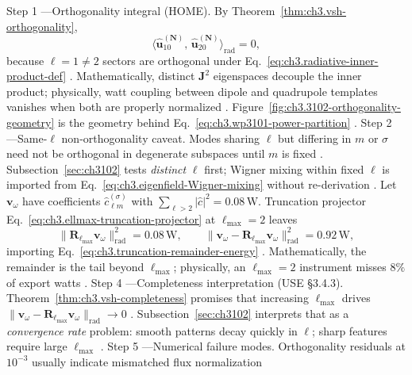 Step 1 ---Orthogonality integral (HOME). By Theorem~\ref{thm:ch3.vsh-orthogonality},
\begin{equation}
\label{eq:ch3.wp3102-orthogonality-integral}
\bigl\langle \widehat{\mathbf{u}}_{10}^{(\mathbf{N})},\,\widehat{\mathbf{u}}_{20}^{(\mathbf{N})}\bigr\rangle_{\mathrm{rad}}
=
0,
\end{equation}
because \(\ell=1\neq2\) sectors are orthogonal under Eq.~\eqref{eq:ch3.radiative-inner-product-def} \cite{hansen1988}.
Mathematically, distinct \(\mathbf{J}^{2}\) eigenspaces decouple the inner product; physically, watt coupling between dipole and quadrupole
templates vanishes when both are properly normalized \cite{poynting1884}. Figure~\ref{fig:ch3.3102-orthogonality-geometry} is the
geometry behind Eq.~\eqref{eq:ch3.wp3101-power-partition} \cite{stratton1941}.
Step 2 ---Same-\(\ell\) non-orthogonality caveat. Modes sharing \(\ell\) but differing in \(m\) or \(\sigma\) need not be orthogonal in degenerate subspaces until \(m\) is fixed
\cite{jackson1999}. Subsection~\ref{sec:ch3102} tests \emph{distinct} \(\ell\) first; Wigner mixing within fixed \(\ell\) is
imported from Eq.~\eqref{eq:ch3.eigenfield-Wigner-mixing} without re-derivation \cite{harrington2001}.
Let \(\mathbf{v}_\omega\) have coefficients \(\widehat{c}_{\ell m}^{(\sigma)}\) with \(\sum_{\ell>2}|\widehat{c}|^{2}=0.08\,\mathrm{W}\).
Truncation projector Eq.~\eqref{eq:ch3.ellmax-truncation-projector} at \(\ell_{\max}=2\) leaves
\begin{equation}
\label{eq:ch3.wp3102-partial-sum-error}
\|\mathbf{R}_{\ell_{\max}}\mathbf{v}_\omega\|_{\mathrm{rad}}^{2}
=
0.08\,\mathrm{W},
\qquad
\|\mathbf{v}_\omega-\mathbf{R}_{\ell_{\max}}\mathbf{v}_\omega\|_{\mathrm{rad}}^{2}
=
0.92\,\mathrm{W},
\end{equation}
importing Eq.~\eqref{eq:ch3.truncation-remainder-energy} \cite{harrington2001}. Mathematically, the remainder is
the tail beyond \(\ell_{\max}\); physically, an \(\ell_{\max}=2\) instrument misses \(8\%\) of export watts \cite{harrington2001}.
Step 4 ---Completeness interpretation (USE §3.4.3). Theorem~\ref{thm:ch3.vsh-completeness} promises that increasing \(\ell_{\max}\) drives
\(\|\mathbf{v}_\omega-\mathbf{R}_{\ell_{\max}}\mathbf{v}_\omega\|_{\mathrm{rad}}\to0\) \cite{kato1995}. Subsection~\ref{sec:ch3102}
interprets that as a \emph{convergence rate} problem: smooth patterns decay quickly in \(\ell\); sharp features require large \(\ell_{\max}\)
\cite{harrington2001}.
Step 5 ---Numerical failure modes. Orthogonality residuals at \(10^{-3}\) usually indicate mismatched flux normalization
